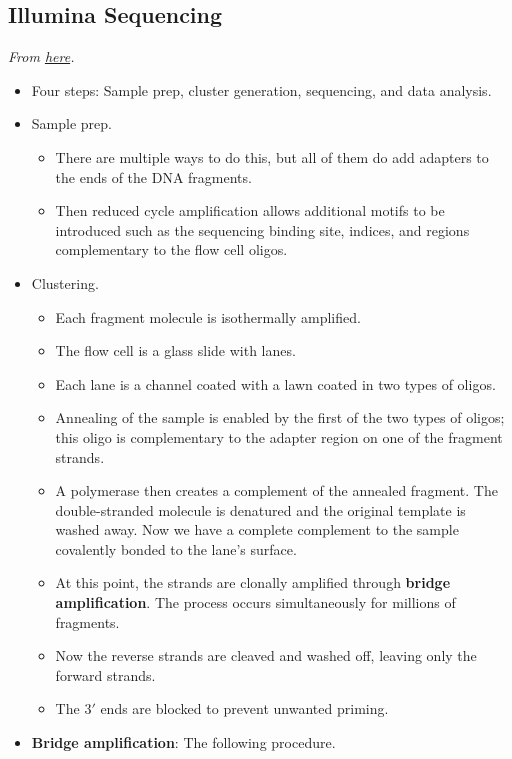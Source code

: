 \documentclass[../notes.tex]{subfiles}
\begin{document}
\subsection*{Illumina Sequencing}
\emph{From \href{https://youtu.be/fCd6B5HRaZ8}{here}.}
\begin{itemize}
    \item Four steps: Sample prep, cluster generation, sequencing, and data analysis.
    \item Sample prep.
    \begin{itemize}
        \item There are multiple ways to do this, but all of them do add adapters to the ends of the DNA fragments.
        \item Then reduced cycle amplification allows additional motifs to be introduced such as the sequencing binding site, indices, and regions complementary to the flow cell oligos.
    \end{itemize}
    \item Clustering.
    \begin{itemize}
        \item Each fragment molecule is isothermally amplified.
        \item The flow cell is a glass slide with lanes.
        \item Each lane is a channel coated with a lawn coated in two types of oligos.
        \item Annealing of the sample is enabled by the first of the two types of oligos; this oligo is complementary to the adapter region on one of the fragment strands.
        \item A polymerase then creates a complement of the annealed fragment. The double-stranded molecule is denatured and the original template is washed away. Now we have a complete complement to the sample covalently bonded to the lane's surface.
        \item At this point, the strands are clonally amplified through \textbf{bridge amplification}. The process occurs simultaneously for millions of fragments.
        \item Now the reverse strands are cleaved and washed off, leaving only the forward strands.
        \item The $3'$ ends are blocked to prevent unwanted priming.
    \end{itemize}
    \item \textbf{Bridge amplification}: The following procedure.
    \begin{enumerate}

\end{enumerate}
\end{itemize}
\end{document}
